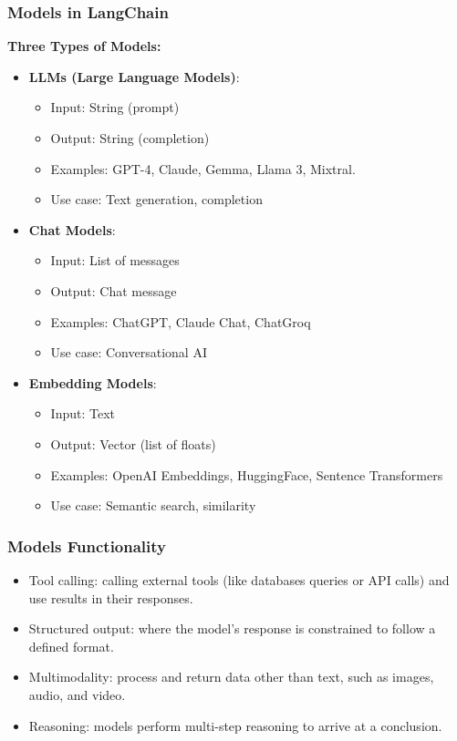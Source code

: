 \begin{frame}\frametitle{Models in LangChain}

\textbf{Three Types of Models:}

\begin{itemize}
\item \textbf{LLMs (Large Language Models)}:
    \begin{itemize}
    \item Input: String (prompt)
    \item Output: String (completion)
    \item Examples: GPT-4, Claude, Gemma, Llama 3, Mixtral.
    \item Use case: Text generation, completion
    \end{itemize}

\item \textbf{Chat Models}:
    \begin{itemize}
    \item Input: List of messages
    \item Output: Chat message
    \item Examples: ChatGPT, Claude Chat, ChatGroq
    \item Use case: Conversational AI
    \end{itemize}

\item \textbf{Embedding Models}:
    \begin{itemize}
    \item Input: Text
    \item Output: Vector (list of floats)
    \item Examples: OpenAI Embeddings, HuggingFace, Sentence Transformers
    \item Use case: Semantic search, similarity
    \end{itemize}
\end{itemize}

\end{frame}

\begin{frame}\frametitle{Models Functionality}


\begin{itemize}
\item  Tool calling: calling external tools (like databases queries or API calls) and use results in their responses.
\item  Structured output: where the model’s response is constrained to follow a defined format.
\item  Multimodality: process and return data other than text, such as images, audio, and video.
\item  Reasoning: models perform multi-step reasoning to arrive at a conclusion.
\end{itemize}

\end{frame}

